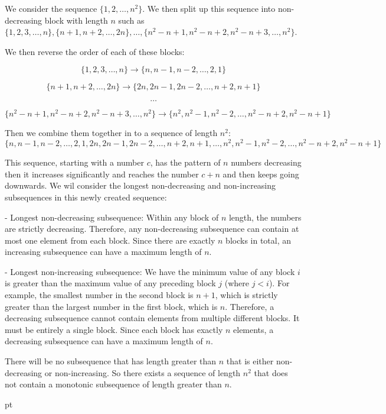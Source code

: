 \documentclass[10pt]{article}
\begin{document}
\begin{enumerate}
 We consider the sequence $\{1,2, \ldots, n^2\}$. We then split up this sequence into non-decreasing block with length $n$ such as $\{1,2,3, \ldots, n\}, \{n+1, n+2, \ldots, 2n\}, \ldots, \{n^2 - n + 1,n^2 - n + 2,n^2 - n + 3, \ldots, n^2\}$.

We then reverse the order of each of these blocks:

$$\{1,2,3, \ldots, n\} \rightarrow \{n,n-1,n-2, \ldots, 2, 1\} $$

$$\{n+1, n+2, \ldots, 2n\} \rightarrow \{2n,2n -1, 2n-2, \ldots, n + 2, n+1\} $$

$$\ldots$$

$$\{n^2 - n + 1,n^2 - n + 2,n^2 - n + 3, \ldots, n^2\} \rightarrow \{n^2,n^2 - 1, n^2-2, \ldots, n^2 - n + 2, n^2 - n + 1\} $$

Then we combine them together in to a sequence of length $n^2$: 
$$\{n,n-1,n-2, \ldots, 2, 1, 2n,2n -1, 2n-2, \ldots, n + 2, n+1, \dots, n^2,n^2 - 1, n^2-2, \ldots, n^2 - n + 2, n^2 - n + 1\}$$ 

This sequence, starting with a number $c$, has the pattern of $n$ numbers decreasing then it increases significantly and reaches the number $c + n$ and then keeps going downwards. We wil consider the longest non-decreasing and non-increasing subsequences in this newly created sequence:

- Longest non-decreasing subsequence: Within any block of $n$ length, the numbers are strictly decreasing. Therefore, any non-decreasing subsequence can contain at most one element from each block. Since there are exactly $n$ blocks in total, an increasing subsequence can have a maximum length of $n$.

- Longest non-increasing subsequence: We have the minimum value of any block $i$ is greater than the maximum value of any preceding block $j$ (where $j < i$). For example, the smallest number in the second block is $n+1$, which is strictly greater than the largest number in the first block, which is $n$. Therefore, a decreasing subsequence cannot contain elements from multiple different blocks. It must be entirely a single block. Since each block has exactly $n$ elements, a decreasing subsequence can have a maximum length of $n$.

There will be no subsequence that has length greater than $n$ that is either non-decreasing or non-increasing. So there exists a sequence of length $n^2$ that does not contain a monotonic subsequence of length greater than $n$.

 pt


\end{enumerate}
\end{document}
